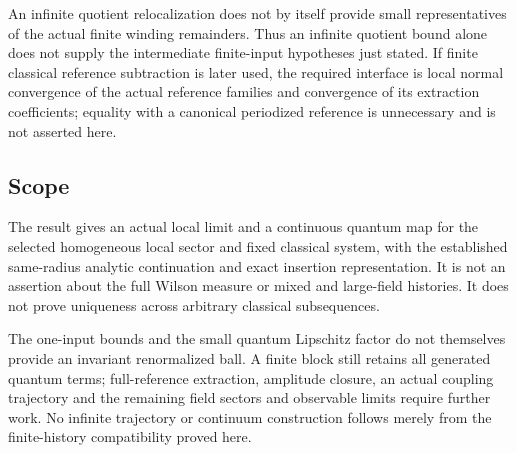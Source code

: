 An infinite quotient relocalization does not by itself provide
small representatives of the actual finite winding remainders.
Thus an infinite quotient bound alone does not supply the
intermediate finite-input hypotheses just stated. If finite
classical reference subtraction is later used, the required
interface is local normal convergence of the actual reference
families and convergence of its extraction coefficients;
equality with a canonical periodized reference is unnecessary
and is not asserted here.

\subsection{Scope}
\label{qll-scope}

The result gives an actual local limit and a continuous
quantum map for the selected homogeneous local sector and
fixed classical system, with the established same-radius
analytic continuation and exact insertion representation.
It is not an assertion about the full Wilson measure or
mixed and large-field histories. It does not prove uniqueness
across arbitrary classical subsequences.

The one-input bounds and the small quantum Lipschitz factor
do not themselves provide an invariant renormalized ball.
A finite block still retains all generated quantum terms;
full-reference extraction, amplitude closure, an actual
coupling trajectory and the remaining field sectors and
observable limits require further work. No infinite
trajectory or continuum construction follows merely from
the finite-history compatibility proved here.
